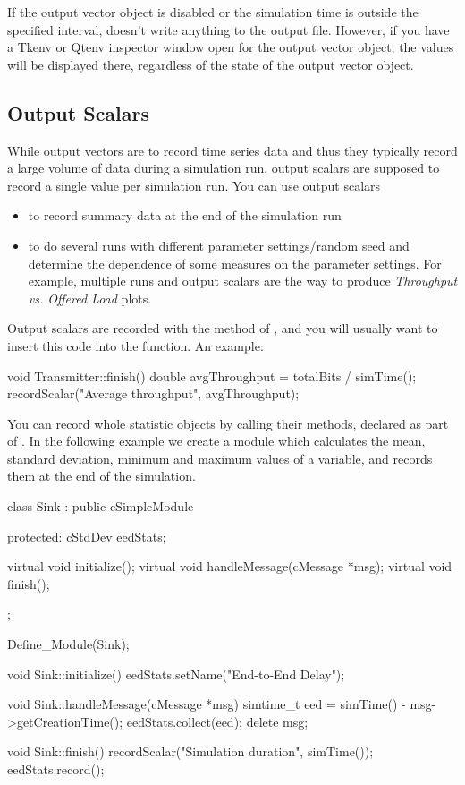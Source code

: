 If the output vector object is disabled or the simulation time is
outside the specified interval,  doesn't write
anything to the output file. However, if you have a Tkenv or Qtenv inspector
window open for the output vector object,
the values will be displayed there, regardless of the state of the
output vector object.



\subsection{Output Scalars}
\label{sec:sim-lib:output-scalars}

While output vectors are to record time series data and thus they
typically record a large volume of data during a simulation run,
output scalars are supposed to record a single
value per simulation run. You can use output scalars

\begin{itemize}
\item{to record summary data at the end of the simulation run}
\item{to do several runs with different parameter settings/random seed
    and determine the dependence of some measures on the parameter
    settings. For example, multiple runs and output scalars are the
    way to produce \textit{Throughput vs. Offered Load} plots.}
\end{itemize}

Output scalars are recorded with the  method of
, and you will usually want to insert this code
into the  function. An example:

\begin{cpp}
void Transmitter::finish()
{
    double avgThroughput = totalBits / simTime();
    recordScalar("Average throughput", avgThroughput);
}
\end{cpp}

You can record whole statistic objects by calling their 
methods, declared as part of . In the following example
we create a  module which calculates the mean, standard
deviation, minimum and maximum values of a variable, and records them at the
end of the simulation.

\begin{cpp}
class Sink : public cSimpleModule
{
  protected:
    cStdDev eedStats;

    virtual void initialize();
    virtual void handleMessage(cMessage *msg);
    virtual void finish();
};

Define_Module(Sink);

void Sink::initialize()
{
    eedStats.setName("End-to-End Delay");
}

void Sink::handleMessage(cMessage *msg)
{
    simtime_t eed = simTime() - msg->getCreationTime();
    eedStats.collect(eed);
    delete msg;
}

void Sink::finish()
{
    recordScalar("Simulation duration", simTime());
    eedStats.record();
}
\end{cpp}

